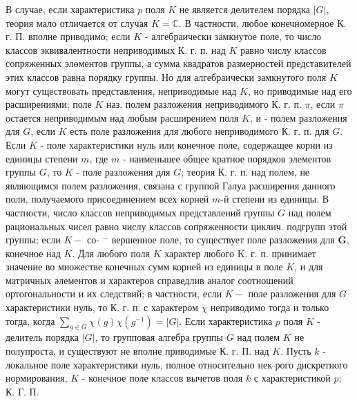 \documentclass[10pt]{article}
\begin{document}
В случае, если характеристика $p$ поля $K$ не является делителем порядка $|G|$, теория мало отличается от случая $K=\mathbb{C}$. В частности, любое конечномерное К. г. П. вполне приводимо; если $K$ - алгебраически замкнутое поле, то число классов эквивалентности неприводимых К. г. п. над $K$ равно числу классов сопряженных элөментов группы, а сумма квадратов размерностей представителей этих классов равна порядку группы. Но для алгебраически замкнутого поля $K$ могут существовать представления, неприводимые над $K$, но приводимые над его расширениями; поле $K$ наз. полем разложения неприводимого К. г. п. $\pi$, если $\pi$ остается неприводимым над любым расширением поля $K$, и - полем разложения для $G$, если $K$ есть поле разложения для любого неприводимого К. г. п. для $G$. Если $K$ - поле характеристики нуль или конечное поле, содержащее корни из единицы степени $m$, где $m$ - наименьшее общее кратное порядков элементов группы $G$, то $K$ - поле разложения для $G$; теория К. г. п. над полем, не являющимся полем разложения, связана с группой Галуа расширения данного поли, получаемого присоединением всех корней $m$-й степени из единицы. В частности, число классов неприводимых представлений группы $G$ над полем рациональных чисел равно числу классов сопряженности циклич. подгрупп этой группы; если $K-$ со- $^{-}$ вершенное поле, то существует поле разложения для $\boldsymbol{G}$, конечное над $K$. Для любого поля $K$ характер любого K. г. п. принимает значение во множестве конечных сумм корней из единицы в поле $K$, и для матричных әлементов и характеров справедлив аналог соотношений ортогональности и их следствий; в частности, если $K-$ поле разложения для $G$ характеристики нуль, то К. г. п. с характером $\chi$ неприводимо тогда и только тогда, когда $\sum_{g \in G} \chi(g) \chi\left(g^{-1}\right)=|G|$. Если характеристика $p$ поля $K$ - делитель порядка $|G|$, то групповая алгебра группы $G$ над полем $K$ не полупроста, и существуют не вполне приводимые К. г. П. над $K$. Пусть $k$ - локальное поле характеристики нуль, полное относительно нек-рого дискретного нормирования, $K$ - конечное поле классов вычетов поля $k$ с характеристикой $p ;$ К. Г. П.
\end{document}
